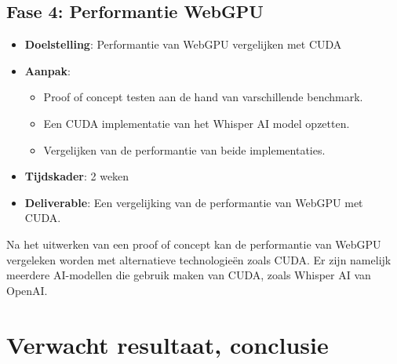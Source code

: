 \subsection*{Fase 4: Performantie WebGPU}

\begin{itemize}
\item \textbf{Doelstelling}: Performantie van WebGPU vergelijken met CUDA
\item \textbf{Aanpak}:
\begin{itemize}
\item Proof of concept testen aan de hand van varschillende benchmark.
\item Een CUDA implementatie van het Whisper AI model opzetten.
\item Vergelijken van de performantie van beide implementaties.
\end{itemize}
\item \textbf{Tijdskader}: 2 weken
\item \textbf{Deliverable}: Een vergelijking van de performantie van WebGPU met CUDA.
\end{itemize}

Na het uitwerken van een proof of concept kan de performantie van WebGPU vergeleken worden met alternatieve technologieën zoals CUDA.
Er zijn namelijk meerdere AI-modellen die gebruik maken van CUDA, zoals Whisper AI van OpenAI.

\section{Verwacht resultaat, conclusie}%
\label{sec:verwachte_resultaten}




